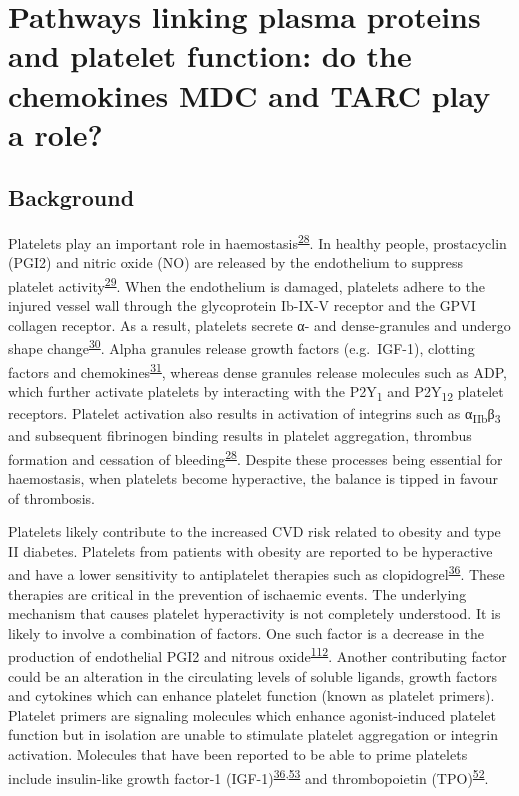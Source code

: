 \documentclass[11pt,twoside]{bristolthesis}
\begin{document}
\hypertarget{chemokine-platelets}{%
\chapter{Pathways linking plasma proteins and platelet function: do the chemokines MDC and TARC play a role?}\label{chemokine-platelets}}

\hypertarget{background-3}{%
\section{Background}\label{background-3}}

Platelets play an important role in haemostasis\textsuperscript{\protect\hyperlink{ref-Rivera2009}{28}}. In healthy people, prostacyclin (PGI2) and nitric oxide (NO) are released by the endothelium to suppress platelet activity\textsuperscript{\protect\hyperlink{ref-Yau2015}{29}}. When the endothelium is damaged, platelets adhere to the injured vessel wall through the glycoprotein Ib-IX-V receptor and the GPVI collagen receptor. As a result, platelets secrete α- and dense-granules and undergo shape change\textsuperscript{\protect\hyperlink{ref-Badimon2012}{30}}. Alpha granules release growth factors (e.g.~IGF-1), clotting factors and chemokines\textsuperscript{\protect\hyperlink{ref-Gear2003}{31}}, whereas dense granules release molecules such as ADP, which further activate platelets by interacting with the P2Y\textsubscript{1} and P2Y\textsubscript{12} platelet receptors. Platelet activation also results in activation of integrins such as α\textsubscript{IIb}β\textsubscript{3} and subsequent fibrinogen binding results in platelet aggregation, thrombus formation and cessation of bleeding\textsuperscript{\protect\hyperlink{ref-Rivera2009}{28}}. Despite these processes being essential for haemostasis, when platelets become hyperactive, the balance is tipped in favour of thrombosis.

Platelets likely contribute to the increased CVD risk related to obesity and type II diabetes. Platelets from patients with obesity are reported to be hyperactive and have a lower sensitivity to antiplatelet therapies such as clopidogrel\textsuperscript{\protect\hyperlink{ref-Nardin2015}{36}}. These therapies are critical in the prevention of ischaemic events. The underlying mechanism that causes platelet hyperactivity is not completely understood. It is likely to involve a combination of factors. One such factor is a decrease in the production of endothelial PGI2 and nitrous oxide\textsuperscript{\protect\hyperlink{ref-BelindeChantemele2012a}{112}}. Another contributing factor could be an alteration in the circulating levels of soluble ligands, growth factors and cytokines which can enhance platelet function (known as platelet primers). Platelet primers are signaling molecules which enhance agonist-induced platelet function but in isolation are unable to stimulate platelet aggregation or integrin activation. Molecules that have been reported to be able to prime platelets include insulin-like growth factor-1 (IGF-1)\textsuperscript{\protect\hyperlink{ref-Nardin2015}{36},\protect\hyperlink{ref-Blair2015}{53}} and thrombopoietin (TPO)\textsuperscript{\protect\hyperlink{ref-Maury2010a}{52}}.
\end{document}

